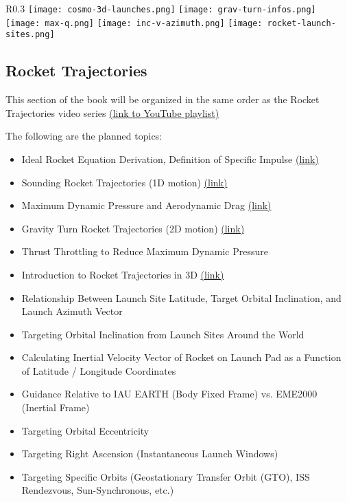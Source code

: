 \documentclass{article}
\begin{document}
\clearpage

\begin{wrapfigure}{R}{0.3\textwidth}
\centering
\texttt{[image: cosmo-3d-launches.png]}
\texttt{[image: grav-turn-infos.png]}
\texttt{[image: max-q.png]}
\texttt{[image: inc-v-azimuth.png]}
\texttt{[image: rocket-launch-sites.png]}
\end{wrapfigure}

\subsection{Rocket Trajectories}
This section of the book will be organized in the same order as the
Rocket Trajectories video series \color{cyan}
\href{https://www.youtube.com/playlist?list=PLOIRBaljOV8je0oxFAyj2o6YLXcBX1rTZ}{(link to YouTube playlist)}\color{white}

\noindent
The following are the planned topics:

\begin{itemize}
	\item Ideal Rocket Equation Derivation, Definition of Specific Impulse \color{cyan}\href{https://youtu.be/bPXjkFAnQio}{(link)} \color{white}
	\item Sounding Rocket Trajectories (1D motion) \color{cyan}\href{https://youtu.be/-4-UfoFgU0A}{(link)} \color{white}
	\item Maximum Dynamic Pressure and Aerodynamic Drag \color{cyan}\href{https://youtu.be/n74TycEj-Xc}{(link)} \color{white}
	\item Gravity Turn Rocket Trajectories (2D motion) \color{cyan}\href{https://youtu.be/n74TycEj-Xc}{(link)} \color{white}
	\item Thrust Throttling to Reduce Maximum Dynamic Pressure
	\item Introduction to Rocket Trajectories in 3D \color{cyan}\href{https://youtu.be/XZXr5BxmReQ}{(link)} \color{white}
	\item Relationship Between Launch Site Latitude, Target Orbital Inclination, and Launch Azimuth Vector
	\item Targeting Orbital Inclination from Launch Sites Around the World
	\item Calculating Inertial Velocity Vector of Rocket on Launch Pad as a Function of Latitude / Longitude Coordinates
	\item Guidance Relative to IAU EARTH (Body Fixed Frame) vs. EME2000 (Inertial Frame)
	\item Targeting Orbital Eccentricity
	\item Targeting Right Ascension (Instantaneous Launch Windows)
	\item Targeting Specific Orbits (Geostationary Transfer Orbit (GTO), ISS Rendezvous, Sun-Synchronous, etc.)
\end{itemize}
\end{document}
